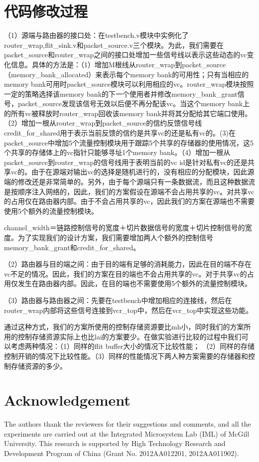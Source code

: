 ﻿\documentclass[10pt,journal]{IEEEtran}
\begin{document}
\section{代码修改过程}
（1）源端与路由器的接口处：在testbench.v模块中实例化了router\_wrap,flit\_sink.v和packet\_source.v三个模块。为此，我们需要在packet\_source和router\_wrap之间的接口处增加一些信号线以表示这些动态的vc变化信息。具体的方法是：（1）增加M根线从router\_wrap到packet\_source（memory\_bank\_allocated）来表示每个memory bank的可用性；只有当相应的memory bank可用时packet\_source模块可以利用相应的vc。router\_wrap模块按照一定的策略选择该memory bank的下一个使用者并修改memory\_bank\_grant信号，packet\_source发现该信号无效以后便不再分配该vc。当这个memory bank上的所有vc被释放时router\_wrap回收该memory bank并将其分配给其它端口使用。（2）增加一根从router\_wrap到packet\_source的信约反馈信号线credit\_for\_shared用于表示当前反馈的信约是共享vc的还是私有vc的。(3)在packet\_source中增加5个流量控制模块用于跟踪5个共享的存储器的使用情况，这5个共享的存储体上的vc指针只能够寻址1个memory bank。（4）增加一根从packet\_source到router\_wrap的信号线用于表明当前的vc id是针对私有vc的还是共享vc的。由于在源端对输出vc的选择是随机进行的，没有相应的分配模块，因此源端的修改还是非常简单的。另外，由于每个源端只有一条数据流，而且这种数据流是按顺序注入网络的，因此，我们的方案假设在源端不会占用共享的vc。对共享vc的占用仅在路由器内部。由于不会占用共享的vc，因此我们的方案在源端也不需要使用5个额外的流量控制模块。

channel\_width＝链路控制信号的宽度＋切片数据信号的宽度＋切片控制信号的宽度。为了实现我们的设计方案，我们需要增加两人个额外的控制信号memory\_bank\_grant和credit\_for\_shared。

（2）路由器与目的端之间：由于目的端有足够的消耗能力，因此在目的端不存在vc不足的情况。因此，我们的方案在目的端也不会占用共享的vc。对于共享vc的占用仅发生在路由器内部。因此，在目的端也不需要使用5个额外的流量控制模块。

（3）路由器与路由器之间：先要在testbench中增加相应的连接线，然后在router\_wrap内部将这些信号连接到vcr\_top中，然后在vcr\_top中实现这些功能。

通过这种方式，我们的方案所使用的控制存储资源要比mh小，同时我们的方案所用的控制存储资源实际上也比lai的方案要少。在做实验进行比较的过程中我们可以考虑两种情况：（1）同样的flit buffer大小的情况下比较性能； （2）同样的存储控制开销的情况下比较性能。（3）同样的性能情况下两人种方案需要的存储器和控制存储资源的多少。

\section*{Acknowledgement}
The authors thank the reviewers for their suggestions and comments, and all the experiments are carried out at the Integrated Microsystem Lab (IML) of McGill University. This research is supported by High Technology Research and Development Program of China (Grant No. 2012AA012201, 2012AA011902).



\end{document}
